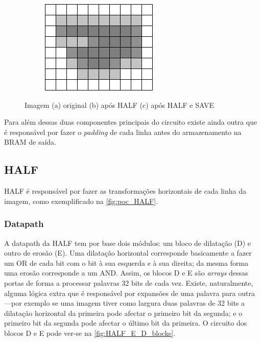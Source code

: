 \documentclass[a4paper]{article}
\begin{document}
\begin{figure}[h]
\begin{subfigure}[b]{0.32\textwidth}
		\includegraphics[width=\linewidth]{poc_SAVE}
		\caption{}
		\label{fig:poc_SAVE}
	\end{subfigure}
	\caption{Imagem (a) original (b) após HALF (c) após HALF e SAVE}
	\label{fig:poc}
\end{figure}

Para além dessas duas componentes principais do circuito existe ainda outra que é responsável por fazer o \textit{padding} de cada linha antes do armazenamento na BRAM de saída.

\subsection{HALF}
HALF é responsável por fazer as transformações horizontais de cada linha da imagem, como exemplificado na \autoref{fig:poc_HALF}.

\subsubsection{Datapath}
A datapath da HALF tem por base dois módulos: um bloco de dilatação (D) e outro de erosão (E). Uma dilatação horizontal corresponde basicamente a fazer um OR de cada bit com o bit à sua esquerda e à sua direita; da mesma forma uma erosão corresponde a um AND. Assim, os blocos D e E são \textit{arrays} dessas portas de forma a processar palavras 32 bits de cada vez. Existe, naturalmente, alguma lógica extra que é responsável por expansões de uma palavra para outra---por exemplo se uma imagem tiver como largura duas palavras de 32 bits a dilatação horizontal da primeira pode afectar o primeiro bit da segunda; e o primeiro bit da segunda pode afectar o último bit da primeira. O circuito dos blocos D e E pode ver-se na \autoref{fig:HALF_E_D_blocks}.
\end{document}
